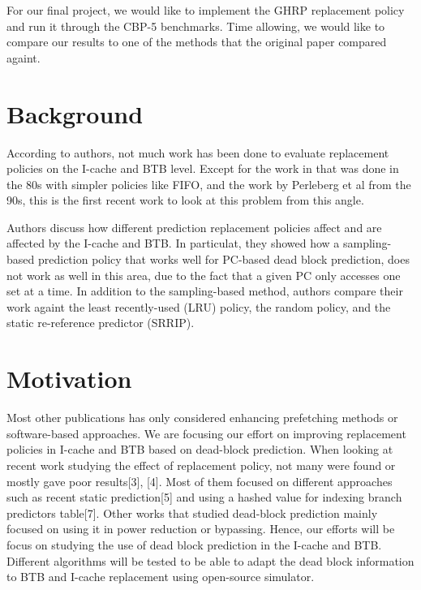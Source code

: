 \documentclass[11pt]{article}
\begin{document}
For our final project, we would like to implement the GHRP replacement policy and run it through the CBP-5 benchmarks. Time allowing, we would like to compare our 
results to one of the methods that the original paper compared againt.

\section{Background}
\label{sec:background}

According to authors, not much work has been done to evaluate replacement policies on the I-cache and BTB level. Except for the work in \cite{smith-1985} that was done in the 80s
with simpler policies like FIFO, and the work by Perleberg et al \cite{perleberg-1993} from the 90s, this is the first recent work to look at this problem from this angle.

Authors discuss how different prediction replacement policies affect and are affected by the I-cache and BTB. In particulat, they showed how a sampling-based
prediction policy that works well for PC-based dead block prediction, does not work as well in this area, due to the fact that a given PC only accesses one set at a time.
In addition to the sampling-based method, authors compare their work againt the least recently-used (LRU) policy, the random policy, and the static re-reference predictor (SRRIP).

\section{Motivation}
\label{sec:motivation}

Most other publications has only considered enhancing prefetching methods or software-based approaches. We are focusing our 
effort on improving replacement policies in I-cache and BTB based on dead-block prediction. When looking at recent work studying 
the effect of replacement policy, not many were found or mostly gave poor results[3], [4]. Most of them focused on different approaches 
such as recent static prediction[5] and using a hashed value for indexing branch predictors table[7]. Other works that studied dead-block 
prediction mainly focused on using it in power reduction or bypassing. Hence, our efforts will be focus on studying the use of dead block prediction
in the I-cache and BTB. Different algorithms will be tested to be able to adapt the dead block information to BTB and I-cache replacement using open-source simulator.  
\end{document}
